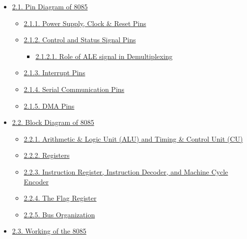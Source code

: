 \documentclass[
]{article}
\begin{document}
\begin{itemize}
  \begin{itemize}
  \item
    \protect\hyperlink{21-pin-diagram-of-8085}{2.1. Pin Diagram of 8085}

    \begin{itemize}
    \item
      \protect\hyperlink{211-power-supply-clock--reset-pins}{2.1.1.
      Power Supply, Clock \& Reset Pins}
    \item
      \protect\hyperlink{212-control-and-status-signal-pins}{2.1.2.
      Control and Status Signal Pins}

      \begin{itemize}
      \item
        \protect\hyperlink{2121-role-of-ale-signal-in-demultiplexing}{2.1.2.1.
        Role of ALE signal in Demultiplexing}
      \end{itemize}
    \item
      \protect\hyperlink{213-interrupt-pins}{2.1.3. Interrupt Pins}
    \item
      \protect\hyperlink{214-serial-communication-pins}{2.1.4. Serial
      Communication Pins}
    \item
      \protect\hyperlink{215-dma-pins}{2.1.5. DMA Pins}
    \end{itemize}
  \item
    \protect\hyperlink{22-block-diagram-of-8085}{2.2. Block Diagram of
    8085}

    \begin{itemize}
    \item
      \protect\hyperlink{221-arithmetic--logic-unit-alu-and-timing--control-unit-cu}{2.2.1.
      Arithmetic \& Logic Unit (ALU) and Timing \& Control Unit (CU)}
    \item
      \protect\hyperlink{222-registers}{2.2.2. Registers}
    \item
      \protect\hyperlink{223-instruction-register-instruction-decoder-and-machine-cycle-encoder}{2.2.3.
      Instruction Register, Instruction Decoder, and Machine Cycle
      Encoder}
    \item
      \protect\hyperlink{224-the-flag-register}{2.2.4. The Flag
      Register}
    \item
      \protect\hyperlink{225-bus-organization}{2.2.5. Bus Organization}
    \end{itemize}
  \item
    \protect\hyperlink{23-working-of-the-8085}{2.3. Working of the 8085}


\end{itemize}
\end{itemize}
\end{document}
